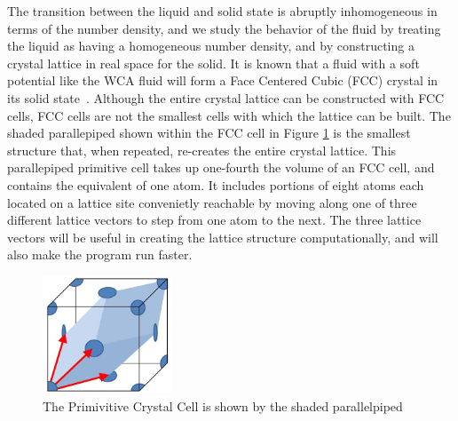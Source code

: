 \documentclass[double,12pt]{beavtex}
\begin{document}
The transition between the liquid 
and solid state is abruptly inhomogeneous in terms of the number density, 
and we study the behavior 
of the fluid by treating the liquid as having a homogeneous number density, 
and by constructing a crystal lattice in real space for the solid. 
It is known that a fluid with a soft potential like the WCA fluid will 
form a Face Centered Cubic (FCC) crystal in its solid state~\cite{Hansen}. 
Although the entire 
crystal lattice can be constructed with FCC cells, 
FCC cells are not the smallest cells with which the lattice can be built. 
The shaded parallepiped shown within the FCC cell in Figure \ref{fig:primitivecell} 
is the smallest structure that, when repeated, re-creates the entire crystal 
lattice. This parallepiped primitive cell takes up one-fourth the volume 
of an FCC cell, and contains the equivalent of one atom.
It includes portions of eight atoms each located on a lattice site convenietly 
reachable by moving along one of three different lattice vectors to step 
from one atom to the next. The three lattice vectors will be useful in 
creating the lattice structure computationally, and will also make the 
program run faster.

  \begin{figure}[h!]
    \centering
    \includegraphics[height=3.5cm]{PrimitiveCellLightBlue.png}
    \caption{The Primivitive Crystal Cell is shown by the shaded parallelpiped}
    \label{fig:primitivecell}
  \end{figure}

\end{document}
